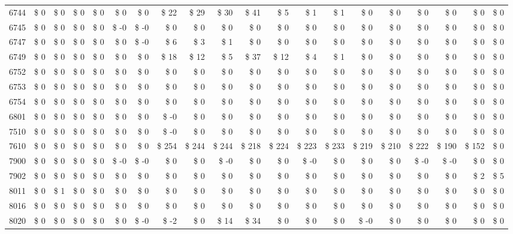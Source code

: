 \begin{longtable}{lrrrrrrrrrrrrrrrrrrr}
6744 & \$ 0 & \$ 0 & \$ 0 & \$ 0 & \$ 0 & \$ 0 & \$ 22 & \$ 29 & \$ 30 & \$ 41 & \$ 5 & \$ 1 & \$ 1 & \$ 0 & \$ 0 & \$ 0 & \$ 0 & \$ 0 & \$ 0 \\
6745 & \$ 0 & \$ 0 & \$ 0 & \$ 0 & \$ -0 & \$ -0 & \$ 0 & \$ 0 & \$ 0 & \$ 0 & \$ 0 & \$ 0 & \$ 0 & \$ 0 & \$ 0 & \$ 0 & \$ 0 & \$ 0 & \$ 0 \\
6747 & \$ 0 & \$ 0 & \$ 0 & \$ 0 & \$ 0 & \$ -0 & \$ 6 & \$ 3 & \$ 1 & \$ 0 & \$ 0 & \$ 0 & \$ 0 & \$ 0 & \$ 0 & \$ 0 & \$ 0 & \$ 0 & \$ 0 \\
6749 & \$ 0 & \$ 0 & \$ 0 & \$ 0 & \$ 0 & \$ 0 & \$ 18 & \$ 12 & \$ 5 & \$ 37 & \$ 12 & \$ 4 & \$ 1 & \$ 0 & \$ 0 & \$ 0 & \$ 0 & \$ 0 & \$ 0 \\
6752 & \$ 0 & \$ 0 & \$ 0 & \$ 0 & \$ 0 & \$ 0 & \$ 0 & \$ 0 & \$ 0 & \$ 0 & \$ 0 & \$ 0 & \$ 0 & \$ 0 & \$ 0 & \$ 0 & \$ 0 & \$ 0 & \$ 0 \\
6753 & \$ 0 & \$ 0 & \$ 0 & \$ 0 & \$ 0 & \$ 0 & \$ 0 & \$ 0 & \$ 0 & \$ 0 & \$ 0 & \$ 0 & \$ 0 & \$ 0 & \$ 0 & \$ 0 & \$ 0 & \$ 0 & \$ 0 \\
6754 & \$ 0 & \$ 0 & \$ 0 & \$ 0 & \$ 0 & \$ 0 & \$ 0 & \$ 0 & \$ 0 & \$ 0 & \$ 0 & \$ 0 & \$ 0 & \$ 0 & \$ 0 & \$ 0 & \$ 0 & \$ 0 & \$ 0 \\
6801 & \$ 0 & \$ 0 & \$ 0 & \$ 0 & \$ 0 & \$ 0 & \$ -0 & \$ 0 & \$ 0 & \$ 0 & \$ 0 & \$ 0 & \$ 0 & \$ 0 & \$ 0 & \$ 0 & \$ 0 & \$ 0 & \$ 0 \\
7510 & \$ 0 & \$ 0 & \$ 0 & \$ 0 & \$ 0 & \$ 0 & \$ -0 & \$ 0 & \$ 0 & \$ 0 & \$ 0 & \$ 0 & \$ 0 & \$ 0 & \$ 0 & \$ 0 & \$ 0 & \$ 0 & \$ 0 \\
7610 & \$ 0 & \$ 0 & \$ 0 & \$ 0 & \$ 0 & \$ 0 & \$ 254 & \$ 244 & \$ 244 & \$ 218 & \$ 224 & \$ 223 & \$ 233 & \$ 219 & \$ 210 & \$ 222 & \$ 190 & \$ 152 & \$ 0 \\
7900 & \$ 0 & \$ 0 & \$ 0 & \$ 0 & \$ -0 & \$ -0 & \$ 0 & \$ 0 & \$ -0 & \$ 0 & \$ 0 & \$ -0 & \$ 0 & \$ 0 & \$ 0 & \$ -0 & \$ -0 & \$ 0 & \$ 0 \\
7902 & \$ 0 & \$ 0 & \$ 0 & \$ 0 & \$ 0 & \$ 0 & \$ 0 & \$ 0 & \$ 0 & \$ 0 & \$ 0 & \$ 0 & \$ 0 & \$ 0 & \$ 0 & \$ 0 & \$ 0 & \$ 2 & \$ 5 \\
8011 & \$ 0 & \$ 1 & \$ 0 & \$ 0 & \$ 0 & \$ 0 & \$ 0 & \$ 0 & \$ 0 & \$ 0 & \$ 0 & \$ 0 & \$ 0 & \$ 0 & \$ 0 & \$ 0 & \$ 0 & \$ 0 & \$ 0 \\
8016 & \$ 0 & \$ 0 & \$ 0 & \$ 0 & \$ 0 & \$ 0 & \$ 0 & \$ 0 & \$ 0 & \$ 0 & \$ 0 & \$ 0 & \$ 0 & \$ 0 & \$ 0 & \$ 0 & \$ 0 & \$ 0 & \$ 0 \\
8020 & \$ 0 & \$ 0 & \$ 0 & \$ 0 & \$ 0 & \$ -0 & \$ -2 & \$ 0 & \$ 14 & \$ 34 & \$ 0 & \$ 0 & \$ 0 & \$ -0 & \$ 0 & \$ 0 & \$ 0 & \$ 0 & \$ 0 \\

\end{longtable}
